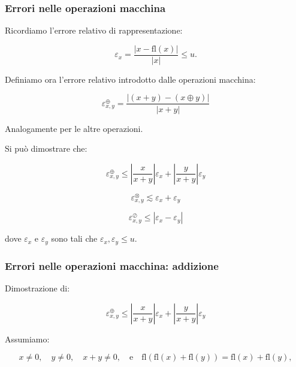 \documentclass[a4paper, 11pt]{article}
\begin{document}
        \subsubsection*{Errori nelle operazioni macchina}
        
        Ricordiamo l'errore relativo di rappresentazione:

        \[
        \varepsilon_x = \frac{|x - \text{fl}(x)|}{|x|} \leq u.
        \]



        Definiamo ora l'errore relativo introdotto dalle operazioni macchina:


        \[
        \varepsilon^{\oplus}_{x,y} = \frac{|(x + y) - (x \oplus y)|}{|x + y|}
        \]


        Analogamente per le altre operazioni.

        Si può dimostrare che:


        \[
        \varepsilon^{\oplus}_{x,y} \leq \left| \frac{x}{x + y} \right| \varepsilon_x + \left| \frac{y}{x + y} \right| \varepsilon_y
        \]





        \[
        \varepsilon^{\otimes}_{x,y} \lesssim \varepsilon_x + \varepsilon_y
        \]





        \[
        \varepsilon^{\oslash}_{x,y} \leq \left| \varepsilon_x - \varepsilon_y \right|
        \]



        dove \(\varepsilon_x\) e \(\varepsilon_y\) sono tali che \(\varepsilon_x, \varepsilon_y \leq u\).

        \subsubsection{Errori nelle operazioni macchina: addizione}

        Dimostrazione di:


        \[
        \varepsilon^{\oplus}_{x,y} \leq \left| \frac{x}{x+y} \right| \varepsilon_x + \left| \frac{y}{x+y} \right| \varepsilon_y
        \]


        \pagebreak
        Assumiamo:


        \[
        x \neq 0, \quad y \neq 0, \quad x + y \neq 0, \quad \text{e} \quad \text{fl}(\text{fl}(x) + \text{fl}(y)) = \text{fl}(x) + \text{fl}(y),
        \]
\end{document}
